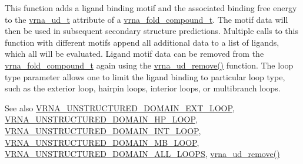 This function adds a ligand binding motif and the associated binding free energy to the \mbox{\hyperlink{group__domains__up_ga0009117b14d29143e8b18ab891f48c2d}{vrna\+\_\+ud\+\_\+t}} attribute of a \mbox{\hyperlink{group__fold__compound_ga1b0cef17fd40466cef5968eaeeff6166}{vrna\+\_\+fold\+\_\+compound\+\_\+t}}. The motif data will then be used in subsequent secondary structure predictions. Multiple calls to this function with different motifs append all additional data to a list of ligands, which all will be evaluated. Ligand motif data can be removed from the \mbox{\hyperlink{group__fold__compound_ga1b0cef17fd40466cef5968eaeeff6166}{vrna\+\_\+fold\+\_\+compound\+\_\+t}} again using the \mbox{\hyperlink{group__domains__up_gada59cb0c498b812eadd010811af3f2d4}{vrna\+\_\+ud\+\_\+remove()}} function. The loop type parameter allows one to limit the ligand binding to particular loop type, such as the exterior loop, hairpin loops, interior loops, or multibranch loops.

\begin{DoxySeeAlso}{See also}
\mbox{\hyperlink{group__domains__up_gaac911374e86236a51bfd42e1f098eaba}{V\+R\+N\+A\+\_\+\+U\+N\+S\+T\+R\+U\+C\+T\+U\+R\+E\+D\+\_\+\+D\+O\+M\+A\+I\+N\+\_\+\+E\+X\+T\+\_\+\+L\+O\+OP}}, \mbox{\hyperlink{group__domains__up_ga23b610ea9564346c45cc1e2bbb62adf7}{V\+R\+N\+A\+\_\+\+U\+N\+S\+T\+R\+U\+C\+T\+U\+R\+E\+D\+\_\+\+D\+O\+M\+A\+I\+N\+\_\+\+H\+P\+\_\+\+L\+O\+OP}}, \mbox{\hyperlink{group__domains__up_gac4a0feccd9654c149203200248c2716b}{V\+R\+N\+A\+\_\+\+U\+N\+S\+T\+R\+U\+C\+T\+U\+R\+E\+D\+\_\+\+D\+O\+M\+A\+I\+N\+\_\+\+I\+N\+T\+\_\+\+L\+O\+OP}}, \mbox{\hyperlink{group__domains__up_ga67b80796655e5227a4ed662bfbe398b0}{V\+R\+N\+A\+\_\+\+U\+N\+S\+T\+R\+U\+C\+T\+U\+R\+E\+D\+\_\+\+D\+O\+M\+A\+I\+N\+\_\+\+M\+B\+\_\+\+L\+O\+OP}}, \mbox{\hyperlink{group__domains__up_ga3c6be4cce70f1af9e885788856101699}{V\+R\+N\+A\+\_\+\+U\+N\+S\+T\+R\+U\+C\+T\+U\+R\+E\+D\+\_\+\+D\+O\+M\+A\+I\+N\+\_\+\+A\+L\+L\+\_\+\+L\+O\+O\+PS}}, \mbox{\hyperlink{group__domains__up_gada59cb0c498b812eadd010811af3f2d4}{vrna\+\_\+ud\+\_\+remove()}}
\end{DoxySeeAlso}

